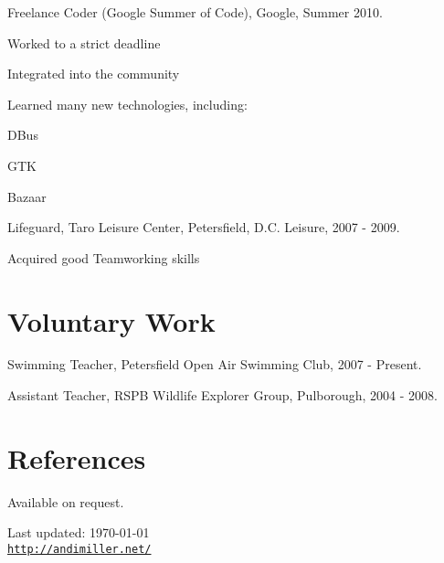 \documentclass[a4paper]{article}
\def\footerlink{http://andimiller.net/}
\renewenvironment{itemize}{
  \begin{list}{}{
    \setlength{\leftmargin}{1.5em}
  }
}{
  \end{list}
}
\newenvironment{packed}{
\begin{itemize}
  \setlength{\itemsep}{0pt}
  \setlength{\parskip}{0pt}
  \setlength{\parsep}{0pt}
}{\end{itemize}}
\begin{document}
\begin{itemize}
\item Freelance Coder (Google Summer of Code), Google, Summer 2010.
	\begin{packed}
	\item Worked to a strict deadline
	\item Integrated into the community
	\item Learned many new technologies, including:
		\begin{packed}
		\item DBus
		\item GTK
		\item Bazaar
		\end{packed}
	\end{packed}
\item Lifeguard, Taro Leisure Center, Petersfield, D.C. Leisure, 2007 - 2009.
	\begin{packed}
	\item Acquired good Teamworking skills
	\end{packed}
\end{itemize}

\section*{Voluntary Work}

\begin{itemize}
\item Swimming Teacher, Petersfield Open Air Swimming Club, 2007 - Present.
\item Assistant Teacher, RSPB Wildlife Explorer Group, Pulborough, 2004 - 2008.
\end{itemize}

\section*{References}
Available on request.

\vfill

\begin{center}
  \begin{footnotesize}
    Last updated: \today \\
    \href{\footerlink}{\texttt{\footerlink}}
  \end{footnotesize}
\end{center}
\end{document}
